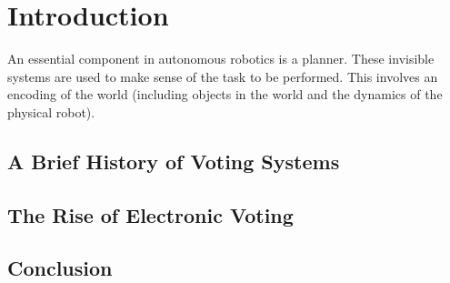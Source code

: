 \chapter{Introduction} \label{intro}
An essential component in autonomous robotics is a planner. These invisible systems are used to make sense of the task to be performed. This involves an encoding of the world (including objects in the world and the dynamics of the physical robot). 


\section{A Brief History of Voting Systems} \label{intro:history}

\section{The Rise of Electronic Voting} \label{intro:evoting}

\section{Conclusion} \label{intro:conclusion}

